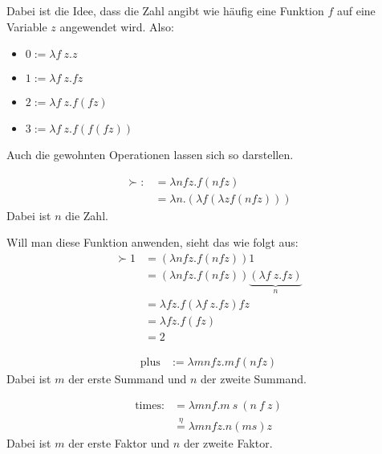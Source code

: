 Dabei ist die Idee, dass die Zahl angibt wie häufig eine Funktion $f$ auf eine
Variable $z$ angewendet wird. Also:
\begin{itemize}
    \item $0 := \lambda f~z. z$
    \item $1 := \lambda f~z. f z$
    \item $2 := \lambda f~z. f (f z)$
    \item $3 := \lambda f~z. f (f (f z))$
\end{itemize}

Auch die gewohnten Operationen lassen sich so darstellen.

\begin{beispiel}
    \begin{align*}
        \succ :&= \lambda n f z. f (n f z)\\
               &= \lambda n. (\lambda f  (\lambda z f (n f z)))
    \end{align*}
    Dabei ist $n$ die Zahl. 

    Will man diese Funktion anwenden, sieht das wie folgt aus:
    \begin{align*}
    \succ 1&= (\lambda n f z. f(n f z)) 1\\
           &= (\lambda n f z. f(n f z)) \underbrace{(\lambda f~z. f z)}_{n}\\
           &= \lambda f z. f (\lambda f~z. f z) f z\\
           &= \lambda f z. f (f z)\\
           &= 2
    \end{align*}
\end{beispiel}

\begin{beispiel}[Addition]
    \begin{align*}
        \text{plus} &:= \lambda m n f z. m f (n f z)
    \end{align*}
    Dabei ist $m$ der erste Summand und $n$ der zweite Summand.
\end{beispiel}

\begin{beispiel}[Multiplikation]
    \begin{align*}
     \text{times} :&= \lambda m n f. m~s~(n~f~z)\\
                   &\overset{\eta}{=} \lambda m n f z. n (m s) z
    \end{align*}
    Dabei ist $m$ der erste Faktor und $n$ der zweite Faktor.
\end{beispiel}

